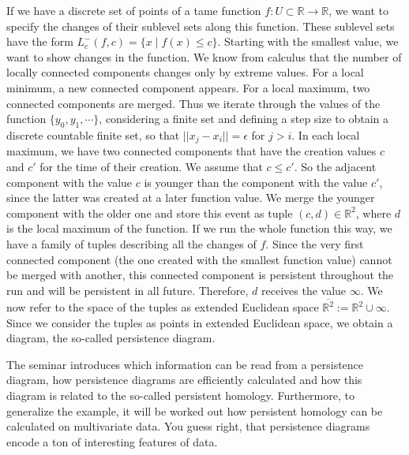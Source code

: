 \documentclass{article}
\begin{document}
If we have a discrete set of points of a tame function $f: U \subset \mathbb{R} \rightarrow \mathbb{R}$, we want to specify the changes of their sublevel sets along this function. These sublevel sets have the form $L^{-}_c(f,c) = \{x \; | \; f(x) \leq c\}$. Starting with the smallest value, we want to show changes in the function. We know from calculus that the number of locally connected components changes only by extreme values. For a local minimum, a new connected component appears. For a local maximum, two connected components are merged. Thus we iterate through the values of the function $\{y_0, y_1, \cdots \}$, considering a finite set and defining a step size to obtain a discrete countable finite set, so that $||x_j - x_i|| = \epsilon$ for $j > i$. In each local maximum, we have two connected components that have the creation values $c$ and $c'$ for the time of their creation. We assume that $c \leq c'$. So the adjacent component with the value $c$ is younger than the component with the value $c'$, since the latter was created at a later function value. We merge the younger component with the older one and store this event as tuple $(c,d) \in \mathbb{R}^2$, where $d$ is the local maximum of the function. If we run the whole function this way, we have a family of tuples describing all the changes of $f$. Since the very first connected component (the one created with the smallest function value) cannot be merged with another, this connected component is persistent throughout the run and will be persistent in all future. Therefore, $d $ receives the value $\infty$. We now refer to the space of the tuples as extended Euclidean space $\overline{\mathbb{R}^2} := \mathbb{R}^2 \cup \infty$. Since we consider the tuples as points in extended Euclidean space, we obtain a diagram, the so-called persistence diagram.

The seminar introduces which information can be read from a persistence diagram, how persistence diagrams are efficiently calculated and how this diagram is related to the so-called persistent homology. Furthermore, to generalize the example, it will be worked out how persistent homology can be calculated on multivariate data. You guess right, that persistence diagrams encode a ton of interesting features of data.
\end{document}
